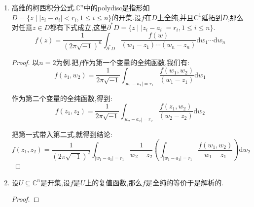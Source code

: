 \begin{enumerate}
\begin{proof}
    	如果$f$是全纯的,也即$\frac{\partial f(z)}{\partial\overline{z}}=0$,任取$z_0\in U$,任取足够小的$\varepsilon>0$,按照上面Cauchy公式有:
    	\begin{align*}
    	f(z)&=\frac{1}{2\pi\sqrt{-1}}\int_{\partial\Delta}\frac{f(w)\mathrm{d}w}{w-z}\\&=\frac{1}{2\pi\sqrt{-1}}\int_{\partial\Delta}\frac{f(w)\mathrm{d}w}{(w-z_0)-(z-z_0)}\\&=\frac{1}{2\pi\sqrt{-1}}\int_{\partial\Delta}\frac{f(w)\mathrm{d}w}{(w-z_0)\left(1-\frac{z-z_0}{w-z_0}\right)}\\&=\sum_{n=0}^{\infty}\left(\frac{1}{2\pi\sqrt{-1}}\int_{\partial\Delta}\frac{f(w)\mathrm{d}w}{(w-z_0)^{n+1}}\right)(z-z_0)^n
    	\end{align*}
    	
    	这说明$f$是解析的.反过来如果$f$是解析的,即对任意$z_0\in U$,存在$\varepsilon>0$使得$z\in B(z_0,\varepsilon)\subseteq U$时有$f(z)=\sum_{n=0}^{\infty}a_n(z-z_0)^n$.按照$(z-z_0)^n$是解析的,说明$f(z)$的部分和满足全纯函数的Cauchy积分公式.取极限就得到:
    	$$f(z)=\frac{1}{2\pi\sqrt{-1}}\int_{\partial\Delta}\frac{f(w)\mathrm{d}w}{w-z}$$
    	
    	求微分就得到:
    	$$\frac{\partial f(z)}{\partial\overline{z}}=\frac{1}{2\pi\sqrt{-1}}\int_{\partial\Delta}\frac{\partial}{\partial\overline{z}}\left(\frac{f(w)}{w-z}\right)\mathrm{d}w=0$$
    	
    	这说明$f$是全纯的.
    \end{proof}
    \item 高维的柯西积分公式.$\mathbb{C}^n$中的polydisc是指形如$D=\{z\mid|z_i-a_i|<r_i,1\le i\le n\}$的开集.设$f$在$D$上全纯,并且$\mathrm{C}^1$延拓到$\overline{D}$,那么对任意$z\in D$都有下式成立,这里$\partial^*D=\{z\mid|z_i-a_i|=r_i,1\le i\le n\}$.
    $$f(z)=\frac{1}{(2\pi\sqrt{-1})^n}\int_{\partial^*D}\frac{f(w)}{(w_1-z_1)\cdots(w_n-z_n)}\mathrm{d}w_1\cdots\mathrm{d}w_n$$
    \begin{proof}
    	
    	以$n=2$为例.把$f$作为第一个变量的全纯函数,我们有:
    	$$f(z_1,w_2)=\frac{1}{2\pi\sqrt{-1}}\int_{|w_1-a_1|=r_1}\frac{f(w_1,w_2)}{(w_1-z_1)}\mathrm{d}w_1$$
    	
    	作为第二个变量的全纯函数,得到:
    	$$f(z_1,z_2)=\frac{1}{2\pi\sqrt{-1}}\int_{|w_2-a_2|=r_2}\frac{f(z_1,w_2)}{(w_2-z_2)}\mathrm{d}w_2$$
    	
    	把第一式带入第二式,就得到结论:
    	$$f(z_1,z_2)=\frac{1}{(2\pi\sqrt{-1})^2}\int_{|w_1-a_1|=r_1}\frac{1}{w_2-z_2}\left(\int_{|w_1-a_1|=r_1}\frac{f(w_1,w_2)}{w_1-z_1}\right)\mathrm{d}w_2$$
    \end{proof}
    \item 设$U\subseteq\mathbb{C}^n$是开集,设$f$是$U$上的复值函数,那么$f$是全纯的等价于是解析的.
    \begin{proof}
    	

\end{proof}
\end{enumerate}
